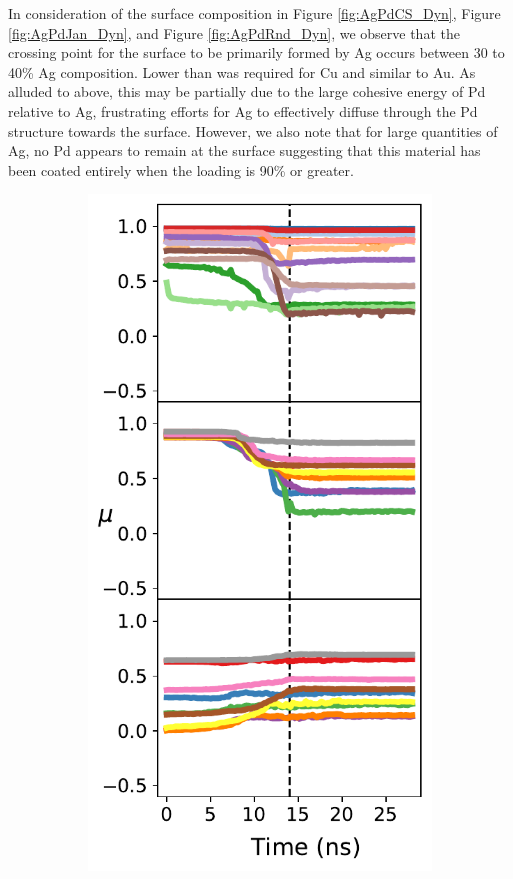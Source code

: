 In consideration of the surface composition in Figure  \ref{fig:AgPdCS_Dyn}, Figure \ref{fig:AgPdJan_Dyn}, and Figure \ref{fig:AgPdRnd_Dyn}, we observe that the crossing point for the surface to be primarily formed by Ag occurs between 30 to 40\% Ag composition. Lower than was required for Cu and similar to Au. As alluded to above, this may be partially due to the large cohesive energy of Pd relative to Ag, frustrating efforts for Ag to effectively diffuse through the Pd structure towards the surface. However, we also note that for large quantities of Ag, no Pd appears to remain at the surface suggesting that this material has been coated entirely when the loading is 90\% or greater.


\begin{figure}
    \centering
\begin{subfigure}{0.39\textwidth}
    \centering
    \smallskip
    \includegraphics[width=\linewidth]{figures/MD/Alloys/Mix_Ag-Pt.pdf}

\end{subfigure}
\end{figure}
